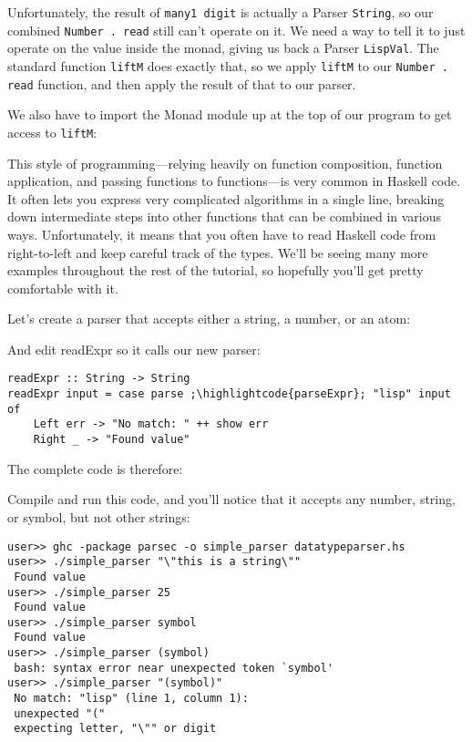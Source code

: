 Unfortunately, the result of \lstinline|many1 digit| is actually a Parser \verb|String|, so our combined \lstinline|Number . read| still can't operate on it. We need a way to tell it to just operate on the value inside the monad, giving us back a Parser \verb|LispVal|. The standard function \verb|liftM| does exactly that, so we apply \verb|liftM| to our \lstinline|Number . read| function, and then apply the result of that to our parser.
 
We also have to import the Monad module up at the top of our program to get access to \verb|liftM|:
 
 
This style of programming---relying heavily on function composition, function application, and passing functions to functions---is very common in Haskell code. It often lets you express very complicated algorithms in a single line, breaking down intermediate steps into other functions that can be combined in various ways. Unfortunately, it means that you often have to read Haskell code from right-to-left and keep careful track of the types. We'll be seeing many more examples throughout the rest of the tutorial, so hopefully you'll get pretty comfortable with it.
 
Let's create a parser that accepts either a string, a number, or an atom:
 
 
And edit readExpr so it calls our new parser:
 
%
\begin{lstlisting}
readExpr :: String -> String
readExpr input = case parse ;\highlightcode{parseExpr}; "lisp" input of
    Left err -> "No match: " ++ show err
    Right _ -> "Found value"
\end{lstlisting}
 
The complete code is therefore:
 
 
Compile and run this code, and you'll notice that it accepts any number, string, or symbol, but not other strings:
 
\begin{lstlisting}[language=shell,numbers=none,nolol]
user>> ghc -package parsec -o simple_parser datatypeparser.hs
user>> ./simple_parser "\"this is a string\""
 Found value
user>> ./simple_parser 25
 Found value
user>> ./simple_parser symbol
 Found value
user>> ./simple_parser (symbol)
 bash: syntax error near unexpected token `symbol'
user>> ./simple_parser "(symbol)"
 No match: "lisp" (line 1, column 1):
 unexpected "("
 expecting letter, "\"" or digit
\end{lstlisting}
 
